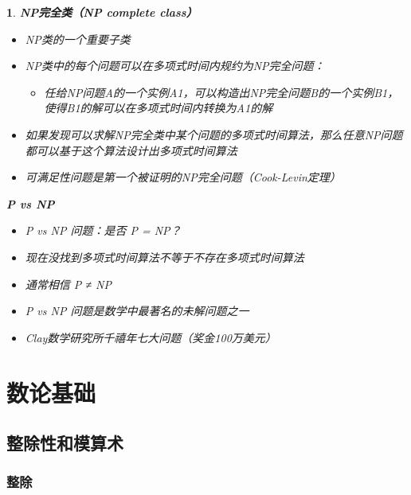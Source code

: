 \documentclass[UTF8]{report}
\theoremstyle{MyLineTheoremStyle} %
\theoremstyle{MyBlockTheoremStyle} %
\theoremstyle{MySubsubsectionStyle} %
\newtheorem{definition}{}
\begin{document}
\begin{definition}
    \textbf{NP完全类（NP complete class）}
    \begin{itemize}
        \item NP类的一个重要子类
        \item NP类中的每个问题可以在多项式时间内规约为NP完全问题：
        \begin{itemize}
            \item 任给NP问题A的一个实例A1，可以构造出NP完全问题B的一个实例B1，使得B1的解可以在多项式时间内转换为A1的解
        \end{itemize}
        \item 如果发现可以求解NP完全类中某个问题的多项式时间算法，那么任意NP问题都可以基于这个算法设计出多项式时间算法
        \item 可满足性问题是第一个被证明的NP完全问题（Cook-Levin定理）
    \end{itemize}

    \textbf{P vs NP}
    \begin{itemize}
        \item P vs NP 问题：是否 P = NP？
        \item 现在没找到多项式时间算法不等于不存在多项式时间算法
        \item 通常相信 P ≠ NP
        \item P vs NP 问题是数学中最著名的未解问题之一
        \item Clay数学研究所千禧年七大问题（奖金100万美元）
    \end{itemize}
\end{definition}




\chapter{数论基础}\thispagestyle{fancy}

\section{整除性和模算术}

\subsection{整除}
\end{document}
